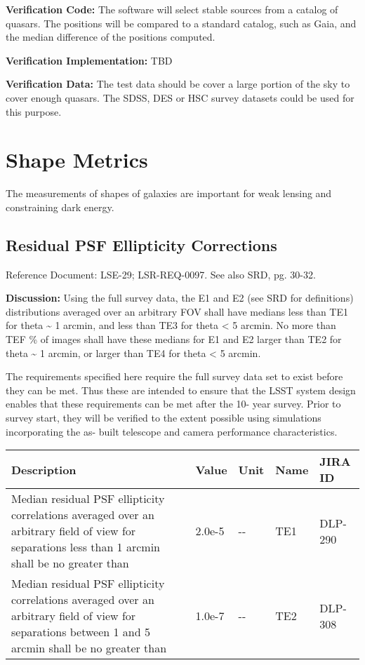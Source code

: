 \documentclass[DM,lsstdraft,toc]{lsstdoc}
\begin{document}
\textbf{Verification Code:} The software will select stable sources from
a catalog of quasars. The positions will be compared to a standard
catalog, such as Gaia, and the median difference of the positions
computed.

\textbf{Verification Implementation:} TBD

\textbf{Verification Data:} The test data should be cover a large
portion of the sky to cover enough quasars. The SDSS, DES or HSC survey
datasets could be used for this purpose.

\section{Shape Metrics}\label{shape-metrics}

The measurements of shapes of galaxies are important for weak lensing
and constraining dark energy.

\subsection{Residual PSF Ellipticity
Corrections}\label{residual-psf-ellipticity-corrections}

Reference Document: LSE-29; LSR-REQ-0097. See also SRD, pg. 30-32.

\textbf{Discussion:} Using the full survey data, the E1 and E2 (see SRD
for definitions) distributions averaged over an arbitrary FOV shall have
medians less than TE1 for theta \textasciitilde{} 1 arcmin, and less
than TE3 for theta \textless{} 5 arcmin. No more than TEF \% of images
shall have these medians for E1 and E2 larger than TE2 for theta
\textasciitilde{} 1 arcmin, or larger than TE4 for theta \textless{} 5
arcmin.

The requirements specified here require the full survey data set to
exist before they can be met. Thus these are intended to ensure that the
LSST system design enables that these requirements can be met after the
10- year survey. Prior to survey start, they will be verified to the
extent possible using simulations incorporating the as- built telescope
and camera performance characteristics.

\begin{longtable}[]{@{}p{}llll@{}}
\toprule
Description & Value & Unit & Name & JIRA ID\tabularnewline
\midrule
\endhead
Median residual PSF ellipticity correlations averaged over an arbitrary
field of view for separations less than 1 arcmin shall be no greater
than & 2.0e-5 & -\/- & TE1 & DLP-290\tabularnewline
Median residual PSF ellipticity correlations averaged over an arbitrary
field of view for separations between 1 and 5 arcmin shall be no greater
than & 1.0e-7 & -\/- & TE2 & DLP-308\tabularnewline
\bottomrule
\end{longtable}
\end{document}

